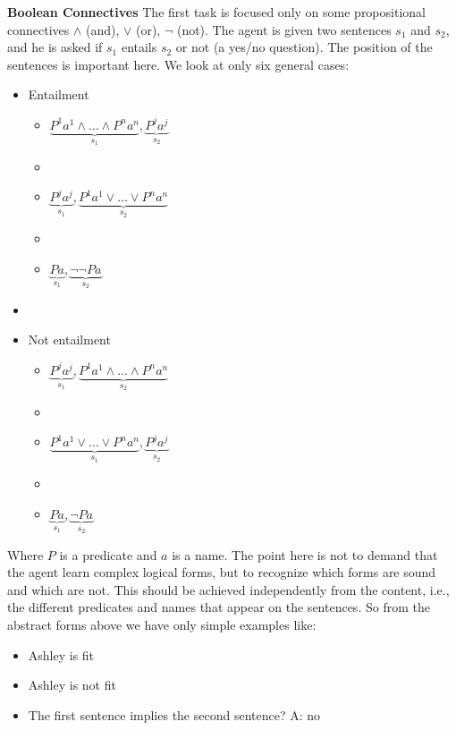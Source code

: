 \textbf{Boolean Connectives} The first task is focused only on some propositional connectives $\land$ (and), $\lor$ (or), $\lnot$ (not). The agent is given two sentences $s_1$ and $s_2$, and he is asked if $s_1$ entails $s_2$ or not (a yes/no question). The position of the sentences is important here. We look at only six general cases:

\begin{itemize}
\item Entailment
\begin{itemize}
\item $\underbrace{P^{1}a^1 \land \dots \land P^{n}a^n}_{s_1}, \underbrace{P^{j}a^j}_{s_2}$ 
\item[]
\item $\underbrace{P^{j}a^j}_{s_1}, \underbrace{P^{1}a^1 \lor \dots \lor P^{n}a^n}_{s_2}$
\item[]
\item $\underbrace{Pa}_{s_1}, \underbrace{\lnot \lnot Pa}_{s_2}$
\end{itemize}
\item[]

\item Not entailment
\begin{itemize}
\item $\underbrace{P^{j}a^j}_{s_1}, \underbrace{P^{1}a^1 \land \dots \land P^{n}a^n}_{s_2}$
\item[]
\item $\underbrace{P^{1}a^1 \lor \dots \lor P^{n}a^n}_{s_1}, \underbrace{P^{j}a^j}_{s_2}$
\item[]
\item $\underbrace{Pa}_{s_1}, \underbrace{\lnot Pa}_{s_2}$
\end{itemize}
\end{itemize}

Where $P$ is a predicate and $a$ is a name. The point here is not to demand that the agent learn complex logical forms, but to recognize which forms are sound and which are not. This should be achieved independently from the content, i.e., the different predicates and names that appear on the sentences. So from the abstract forms above we have only simple examples like:

\begin{itemize} 
\item[] Ashley is fit
\item[] Ashley is not fit
\item[] The first sentence implies the second sentence? A: no
\end{itemize}

